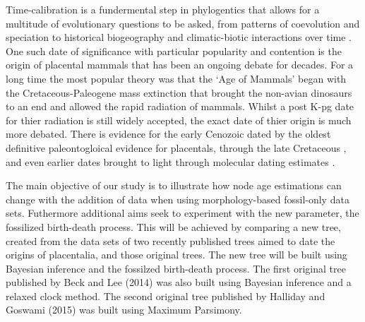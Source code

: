 \documentclass[11pt,letterpaper]{article}
\begin{document}
Time-calibration is a fundermental step in phylogentics that allows for a multitude of evolutionary questions to be asked, from patterns of coevolution and speciation to historical biogeography and climatic-biotic interactions over time \citep{heath2014fossilized}. One such date of significance with particular popularity and contention is the origin of placental mammals that has been an ongoing debate for decades. For a long time the most popular theory was that the `Age of Mammals' began with the Cretaceous-Paleogene mass extinction that brought the non-avian dinosaurs to an end and allowed the rapid radiation of mammals. %
Whilst a post K-pg date for thier radiation is still widely accepted,%
 the exact date of thier origin is much more debated. There is evidence for the early Cenozoic \citep{wible2007cretaceous} dated by the oldest definitive paleontogloical evidence for placentals, through the late Cretaceous \citep{archibald2011protungulatum}, \citep{hooker2014new} and even earlier dates brought to light through molecular dating estimates \citep{dos2012phylogenomic}.   


The main objective of our study is to illustrate how node age estimations can change with the addition of data when using morphology-based fossil-only data sets. %
 Futhermore additional aims seek to experiment with the new parameter, the fossilized birth-death process. This will be achieved by comparing a new tree, created from the data sets of two recently published trees aimed to date the origins of placentalia, and those original trees.
 The new tree will be built using Bayesian inference and the fossilzed birth-death process. %
 The first original tree published by Beck and Lee (2014) was also built using Bayesian inference and a relaxed clock method. The second original tree published by Halliday and Goswami (2015) was built using Maximum Parsimony. %
\end{document}
